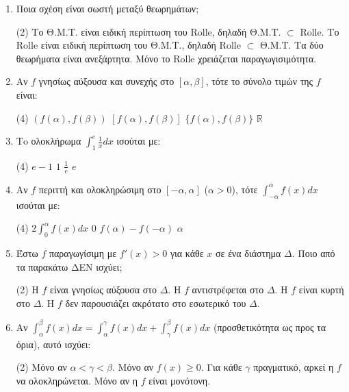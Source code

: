 \documentclass[11pt,a4paper]{article}
\renewcommand{\textdexiakeraia}{}
\newcommand{\dint}{\displaystyle\int}
\begin{document}
\begin{enumerate}[label=\textbf{\arabic*.}, itemsep=4mm]
    \item Ποια σχέση είναι σωστή μεταξύ θεωρημάτων;
    \begin{tasks}[label=\let\textdexiakeraia\relax\alph*.](2)
        \task Το Θ.Μ.Τ. είναι ειδική περίπτωση του Rolle, δηλαδή Θ.Μ.Τ. $\subset$ Rolle.
        \task Το Rolle είναι ειδική περίπτωση του Θ.Μ.Τ., δηλαδή Rolle $\subset$ Θ.Μ.Τ.
        \task Τα δύο θεωρήματα είναι ανεξάρτητα.
        \task Μόνο το Rolle χρειάζεται παραγωγισιμότητα.
    \end{tasks}

    \item Αν $f$ γνησίως αύξουσα και συνεχής στο $[\alpha, \beta]$, τότε το σύνολο τιμών της $f$ είναι:
    \begin{tasks}[label=\let\textdexiakeraia\relax\alph*.](4)
        \task $(f(\alpha), f(\beta))$
        \task $[f(\alpha), f(\beta)]$
        \task $\{f(\alpha), f(\beta)\}$
        \task $\mathbb{R}$
    \end{tasks}

    \item Τo ολοκλήρωμα $\dint_1^e \frac{1}{x} dx$ ισούται με:
    \begin{tasks}[label=\let\textdexiakeraia\relax\alph*.](4)
        \task $e-1$
        \task $1$
        \task $\frac{1}{e}$
        \task $e$
    \end{tasks}

    \item Αν $f$ περιττή και ολοκληρώσιμη στο $[-\alpha, \alpha]$ ($\alpha > 0$), τότε $\dint_{-\alpha}^{\alpha} f(x) dx$ ισούται με:
    \begin{tasks}[label=\let\textdexiakeraia\relax\alph*.](4)
        \task $2 \dint_0^\alpha f(x)dx$
        \task $0$
        \task $f(\alpha) - f(-\alpha)$
        \task $\alpha$
    \end{tasks}

    \item Έστω $f$ παραγωγίσιμη με $f'(x) > 0$ για κάθε $x$ σε ένα διάστημα $\Delta$. Ποιο από τα παρακάτω ΔΕΝ ισχύει;
    \begin{tasks}[label=\let\textdexiakeraia\relax\alph*.](2)
        \task Η $f$ είναι γνησίως αύξουσα στο $\Delta$.
        \task Η $f$ αντιστρέφεται στο $\Delta$.
        \task Η $f$ είναι κυρτή στο $\Delta$.
        \task Η $f$ δεν παρουσιάζει ακρότατο στο εσωτερικό του $\Delta$.
    \end{tasks}

    \item Αν $\dint_\alpha^\beta f(x) dx = \dint_\alpha^\gamma f(x) dx + \dint_\gamma^\beta f(x) dx$ (προσθετικότητα ως προς τα όρια), αυτό ισχύει:
    \begin{tasks}[label=\let\textdexiakeraia\relax\alph*.](2)
        \task Μόνο αν $\alpha < \gamma < \beta$.
        \task Μόνο αν $f(x) \ge 0$.
        \task Για κάθε $\gamma$ πραγματικό, αρκεί η $f$ να ολοκληρώνεται.
        \task Μόνο αν η $f$ είναι μονότονη.
    \end{tasks}

\end{enumerate}
\end{document}
